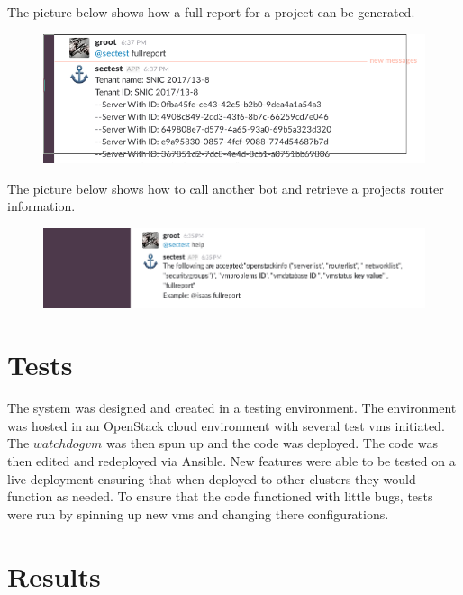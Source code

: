 \documentclass[12pt]{article}
\begin{document}
The picture below shows how a full report for a project can be generated.
\begin{figure}[ht]
    \includegraphics[scale=.5]{./pic/2017-06-13-183745_677x229_scrot.png}
\end{figure}

The picture below shows how to call another bot and retrieve a projects router information.
\begin{figure}[ht]
    \includegraphics[scale=.5]{./pic/2017-06-13-183710_855x179_scrot.png}
\end{figure}

\section{Tests}
The system was designed and created in a testing environment. The environment was hosted in an OpenStack cloud environment with several test vms initiated. The $watchdog vm$ was then spun up and the code was deployed. The code was then edited and redeployed via Ansible. New features were able to be tested on a live deployment ensuring that when deployed to other clusters they would function as needed. To ensure that the code functioned with little bugs, tests were run by spinning up new vms and changing there configurations.

\section{Results}
\end{document}
